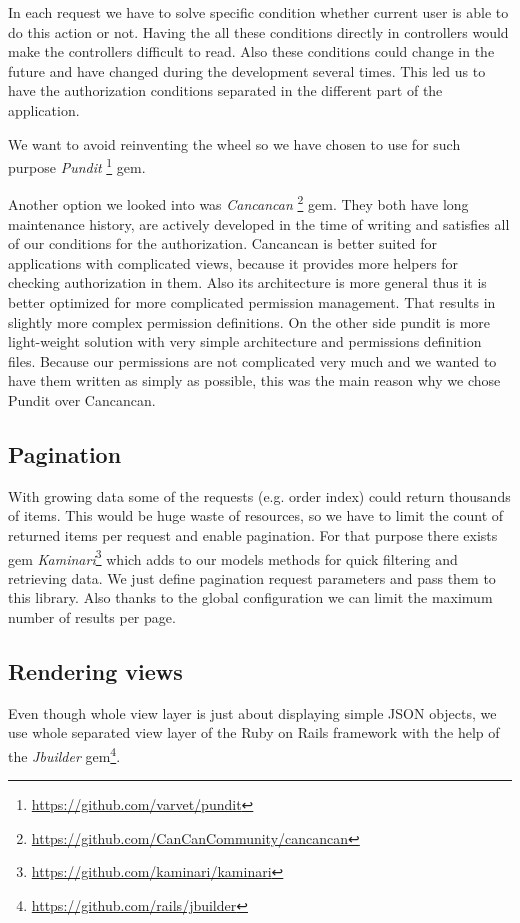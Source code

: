 In each request we have to solve specific condition whether current user is able to do this action or not. Having the all these conditions directly in controllers would make the controllers difficult to read. Also these conditions could change in the future and have changed during the development several times. This led us to have the authorization conditions separated in the different part of the application.

We want to avoid reinventing the wheel so we have chosen to use for such purpose \textit{Pundit} \footnote{\url{https://github.com/varvet/pundit}} gem. 

Another option we looked into was \textit{Cancancan} \footnote{\url{https://github.com/CanCanCommunity/cancancan}} gem. They both have long maintenance history, are actively developed in the time of writing and satisfies all of our conditions for the authorization. Cancancan is better suited for applications with complicated views, because it provides more helpers for checking authorization in them. Also its architecture is more general thus it is better optimized for more complicated permission management. That results in slightly more complex permission definitions. On the other side pundit is more light-weight solution with very simple architecture and permissions definition files. Because our permissions are not complicated very much and we wanted to have them written as simply as possible, this was the main reason why we chose Pundit over Cancancan.

 \subsection{Pagination}
 With growing data some of the requests (e.g. order index) could return thousands of items. This would be huge waste of resources, so we have to limit the count of returned items per request and enable pagination. For that purpose there exists gem \textit{Kaminari}\footnote{\url{https://github.com/kaminari/kaminari}} which adds to our models methods for quick filtering and retrieving data. We just define pagination request parameters and pass them to this library. Also thanks to the global configuration we can limit the maximum number of results per page.

\subsection{Rendering views}
	Even though whole view layer is just about displaying simple JSON objects, we use whole separated view layer of the Ruby on Rails framework with the help of the \textit{Jbuilder} gem\footnote{\url{https://github.com/rails/jbuilder}}.
	
